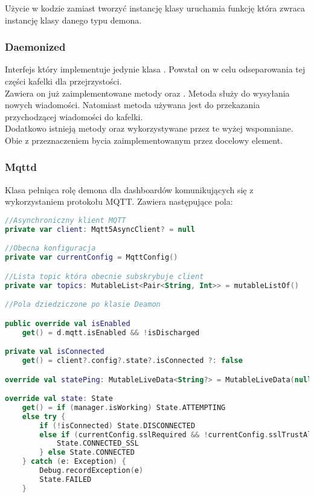 Użycie w kodzie  zamiast tworzyć instancję klasy  uruchamia funkcję  która zwraca instancję klasy danego typu demona.

\subsubsection{Daemonized}
Interfejs który implementuje jedynie klasa . Powstał on w celu odseparowania tej części kafelki dla przejrzystości.\\

Zawiera on już zaimplementowane metody  oraz . Metoda  służy do wysyłania nowych wiadomości. Natomiast metoda  używana jest do przekazania przychodzącej wiadomości do kafelki.\\

Dodatkowo istnieją metody  oraz  wykorzystywane przez te wyżej wspomniane. Obie z przeznaczeniem bycia zaimplementowanym przez docelowy element.

\newpage

\subsubsection{Mqttd}
Klasa pełniąca rolę demona dla dashboardów komunikujących się z wykorzystaniem protokołu MQTT. Zawiera następujące pola:

\begin{lstlisting}[language=Kotlin]
//Asynchroniczny klient MQTT
private var client: Mqtt5AsyncClient? = null

//Obecna konfiguracja
private var currentConfig = MqttConfig()

//Lista topic która obecnie subskrybuje client
private var topics: MutableList<Pair<String, Int>> = mutableListOf()

//Pola dziedziczone po klasie Deamon

public override val isEnabled
    get() = d.mqtt.isEnabled && !isDischarged

private val isConnected
    get() = client?.config?.state?.isConnected ?: false

override val statePing: MutableLiveData<String?> = MutableLiveData(null)

override val state: State
    get() = if (manager.isWorking) State.ATTEMPTING
    else try {
        if (!isConnected) State.DISCONNECTED
        else if (currentConfig.sslRequired && !currentConfig.sslTrustAll) {
            State.CONNECTED_SSL
        } else State.CONNECTED
    } catch (e: Exception) {
        Debug.recordException(e)
        State.FAILED
    }
\end{lstlisting}

